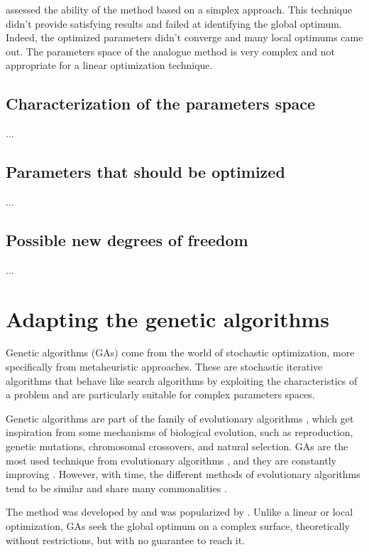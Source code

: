 \documentclass[twocol]{ametsoc}
\begin{document}
\citet{Horton2012a} assessed the ability of the \citep{Nelder1965a} method based on a simplex approach. This technique didn't provide satisfying results and failed at identifying the global optimum. Indeed, the optimized parameters didn't converge and many local optimums came out. The parameters space of the analogue method is very complex and not appropriate for a linear optimization technique. 


\subsection{Characterization of the parameters space}
...

\subsection{Parameters that should be optimized}
...

\subsection{Possible new degrees of freedom}
...


\section{Adapting the genetic algorithms}

Genetic algorithms (GAs) come from the world of stochastic optimization, more specifically from metaheuristic approaches. These are stochastic iterative algorithms that behave like search algorithms by exploiting the characteristics of a problem and are particularly suitable for complex parameters spaces.

Genetic algorithms are part of the family of evolutionary algorithms \citet{Back1993c, Schwefel1993}, which get inspiration from some mechanisms of biological evolution, such as reproduction, genetic mutations, chromosomal crossovers, and natural selection. GAs are the most used technique from evolutionary algorithms \citep{Back1993b}, and they are constantly improving \citep{Haupt2004}. However, with time, the different methods of evolutionary algorithms tend to be similar and share many commonalities \citep{Back1996b, Haupt2004}.

The method was developed by \citet{Holland1992b} and was popularized by \citet{Goldberg1989}. Unlike a linear or local optimization, GAs seek the global optimum on a complex surface, theoretically without restrictions, but with no guarantee to reach it.
\end{document}
